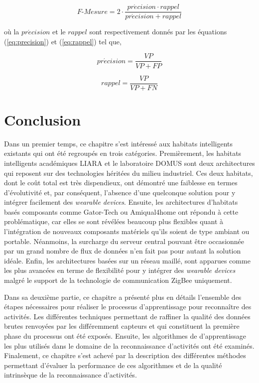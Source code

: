 \begin{equation}
	\label{eq:f-score}
	F\mbox{-} Mesure = 2 \cdot \frac{pr\acute{e}cision \cdot rappel}{pr\acute{e}cision + rappel}
\end{equation}

\noindent où la $pr\acute{e}cision$ et le $rappel$ sont respectivement donnés par les équations (\ref{eq:precision}) et (\ref{eq:rappel}) tel que,

\begin{equation}
	\label{eq:precision}
	pr\acute{e}cision = \frac{VP}{VP+FP}
\end{equation}

\begin{equation}
	\label{eq:rappel}
	rappel = \frac{VP}{VP+FN}
\end{equation}

\section{Conclusion}

Dans un premier temps, ce chapitre s'est intéressé aux habitats intelligents existants qui ont été regroupés en trois catégories. Premièrement, les habitats intelligents académiques \acs{LIARA} et le laboratoire \acs{DOMUS} sont deux architectures qui reposent sur des technologies héritées du milieu industriel. Ces deux habitats, dont le coût total est très dispendieux, ont démontré une faiblesse en termes d'évolutivité et, par conséquent, l'absence d'une quelconque solution pour y intégrer facilement des \textit{wearable devices}. Ensuite, les architectures d'habitats basés composants comme Gator-Tech ou Amiqual4home ont répondu à cette problématique, car elles se sont révélées beaucoup plus flexibles quant à l'intégration de nouveaux composants matériels qu'ils soient de type ambiant ou portable. Néanmoins, la surcharge du serveur central pouvant être occasionnée par un grand nombre de flux de données n'en fait pas pour autant la solution idéale. Enfin, les architectures basées sur un réseau maillé, sont apparues comme les plus avancées en terme de flexibilité pour y intégrer des \textit{wearable devices} malgré le support de la technologie de communication ZigBee uniquement.

Dans sa deuxième partie, ce chapitre a présenté plus en détails l’ensemble des étapes nécessaires pour réaliser le processus d'apprentissage pour reconnaître des activités. Les différentes techniques permettant de raffiner la qualité des données brutes renvoyées par les différemment capteurs et qui constituent la première phase du processus ont été exposés. Ensuite, les algorithmes de d'apprentissage les plus utilisés dans le domaine de la reconnaissance d'activités ont été examinés. Finalement, ce chapitre s'est achevé par la description des différentes méthodes permettant d'évaluer la performance de ces algorithmes et de la qualité intrinsèque de la reconnaissance d'activités.